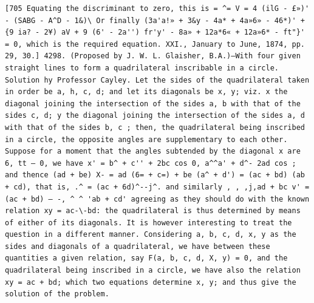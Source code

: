 \documentclass[12pt]{article}
\theoremstyle{plain}
\begin{document}
\newpage
\setcounter{page}{578}
\begin{verbatim}
[705 Equating the discriminant to zero, this is = ^= V = 4 (ilG - £»)' - (SABG - A^D - 1&)\ Or finally (3a'a!» + 3&y - 4a* + 4a»6» - 46*)' + {9 ia? - 2¥) aV + 9 (6' - 2a'') fr'y' - 8a» + 12a*6« + 12a»6* - ft"}' = 0, which is the required equation. XXI., January to June, 1874, pp. 29, 30.] 4298. (Proposed by J. W. L. Glaisher, B.A.)—With four given straight lines to form a quadrilateral inscribable in a circle. Solution hy Professor Cayley. Let the sides of the quadrilateral taken in order be a, h, c, d; and let its diagonals be x, y; viz. x the diagonal joining the intersection of the sides a, b with that of the sides c, d; y the diagonal joining the intersection of the sides a, d with that of the sides b, c ; then, the quadrilateral being inscribed in a circle, the opposite angles are supplementary to each other. Suppose for a moment that the angles subtended by the diagonal x are 6, tt — 0, we have x' = b^ + c'' + 2bc cos 0, a^^a' + d^- 2ad cos ; and thence (ad + be) X- = ad (6= + c=) + be (a^ + d') = (ac + bd) (ab + cd), that is, .^ = (ac + 6d)^--j^. and similarly , , ,j,ad + bc v' = (ac + bd) — -, ^ ^ 'ab + cd' agreeing as they should do with the known relation xy = ac-\-bd: the quadrilateral is thus determined by means of either of its diagonals. It is however interesting to treat the question in a different manner. Considering a, b, c, d, x, y as the sides and diagonals of a quadrilateral, we have between these quantities a given relation, say F(a, b, c, d, X, y) = 0, and the quadrilateral being inscribed in a circle, we have also the relation xy = ac + bd; which two equations determine x, y; and thus give the solution of the problem. 
\end{verbatim}
\end{document}
